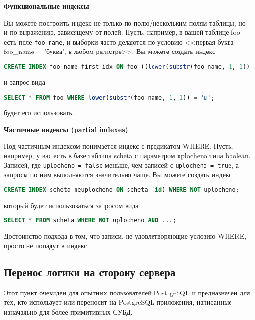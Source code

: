 \textbf{Функциональные индексы}

Вы можете построить индекс не только по полю/нескольким полям таблицы, но и по выражению, зависящему от полей. Пусть, например, в вашей таблице foo есть поле \lstinline!foo_name!, и выборки часто делаются по условию <<первая буква foo\_name = 'буква', в любом регистре>>. Вы можете создать индекс

\begin{lstlisting}[language=SQL,label=lst:summary-indexes1,caption=Индекс]
CREATE INDEX foo_name_first_idx ON foo ((lower(substr(foo_name, 1, 1))));
\end{lstlisting}

и запрос вида

\begin{lstlisting}[language=SQL,label=lst:summary-indexes2,caption=Запрос]
SELECT * FROM foo WHERE lower(substr(foo_name, 1, 1)) = 'ы';
\end{lstlisting}

будет его использовать.

\textbf{Частичные индексы (partial indexes)}

Под частичным индексом понимается индекс с предикатом WHERE. Пусть, например, у вас есть в базе таблица scheta с параметром uplocheno типа boolean. Записей, где \lstinline!uplocheno = false! меньше, чем записей с \lstinline!uplocheno = true!, а запросы по ним выполняются значительно чаще. Вы можете создать индекс

\begin{lstlisting}[language=SQL,label=lst:summary-indexes3,caption=Индекс]
CREATE INDEX scheta_neuplocheno ON scheta (id) WHERE NOT uplocheno;
\end{lstlisting}

который будет использоваться запросом вида

\begin{lstlisting}[language=SQL,label=lst:summary-indexes4,caption=Запрос]
SELECT * FROM scheta WHERE NOT uplocheno AND ...;
\end{lstlisting}

Достоинство подхода в том, что записи, не удовлетворяющие условию WHERE, просто не попадут в индекс.


\subsection{Перенос логики на сторону сервера}

Этот пункт очевиден для опытных пользователей PostrgeSQL и предназначен для тех, кто использует или переносит на PostgreSQL приложения, написанные изначально для более примитивных СУБД.

